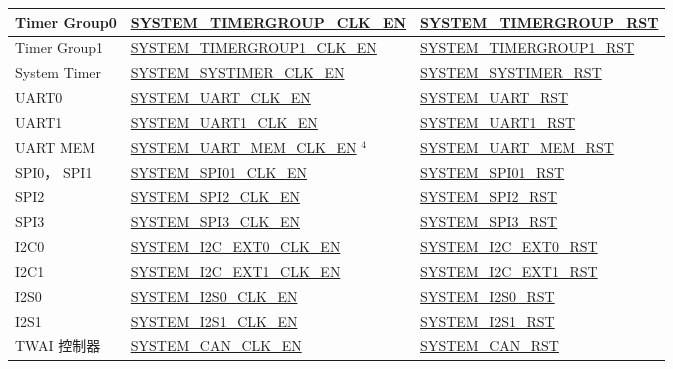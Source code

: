 \documentclass[main\_\_CN.tex]{subfiles}
\begin{document}
\begin{longtable}[c]{ |p{4cm}|p{6cm}|p{6cm}| }
Timer Group0    & \hyperref[fielddesc:SYSTEMTIMERGROUPCLKEN]{SYSTEM\_TIMERGROUP\_CLK\_EN} & \hyperref[fielddesc:SYSTEMTIMERGROUPRST]{SYSTEM\_TIMERGROUP\_RST} \\\hline
Timer Group1    & \hyperref[fielddesc:SYSTEMTIMERGROUP1CLKEN]{SYSTEM\_TIMERGROUP1\_CLK\_EN} & \hyperref[fielddesc:SYSTEMTIMERGROUP1RST]{SYSTEM\_TIMERGROUP1\_RST} \\\hline
System Timer    & \hyperref[fielddesc:SYSTEMSYSTIMERCLKEN]{SYSTEM\_SYSTIMER\_CLK\_EN} & \hyperref[fielddesc:SYSTEMSYSTIMERRST]{SYSTEM\_SYSTIMER\_RST} \\\hline
UART0    & \hyperref[fielddesc:SYSTEMUARTCLKEN]{SYSTEM\_UART\_CLK\_EN} & \hyperref[fielddesc:SYSTEMUARTRST]{SYSTEM\_UART\_RST} \\\hline
UART1    & \hyperref[fielddesc:SYSTEMUART1CLKEN]{SYSTEM\_UART1\_CLK\_EN} & \hyperref[fielddesc:SYSTEMUART1RST]{SYSTEM\_UART1\_RST} \\\hline
UART MEM    & \hyperref[fielddesc:SYSTEMUARTMEMCLKEN]{SYSTEM\_UART\_MEM\_CLK\_EN} {\hyperref[other:sysreg-reset-notes]{$^4$}} & \hyperref[fielddesc:SYSTEMUARTMEMRST]{SYSTEM\_UART\_MEM\_RST} \\\hline
SPI0， SPI1    & \hyperref[fielddesc:SYSTEMSPI01CLKEN]{SYSTEM\_SPI01\_CLK\_EN} & \hyperref[fielddesc:SYSTEMSPI01RST]{SYSTEM\_SPI01\_RST} \\\hline
SPI2    & \hyperref[fielddesc:SYSTEMSPI2CLKEN]{SYSTEM\_SPI2\_CLK\_EN} & \hyperref[fielddesc:SYSTEMSPI2RST]{SYSTEM\_SPI2\_RST} \\\hline
SPI3    & \hyperref[fielddesc:SYSTEMSPI3CLKEN]{SYSTEM\_SPI3\_CLK\_EN} & \hyperref[fielddesc:SYSTEMSPI3RST]{SYSTEM\_SPI3\_RST} \\\hline
I2C0    & \hyperref[fielddesc:SYSTEMI2CEXT0CLKEN]{SYSTEM\_I2C\_EXT0\_CLK\_EN} & \hyperref[fielddesc:SYSTEMI2CEXT0RST]{SYSTEM\_I2C\_EXT0\_RST} \\\hline
I2C1    & \hyperref[fielddesc:SYSTEMI2CEXT1CLKEN]{SYSTEM\_I2C\_EXT1\_CLK\_EN} & \hyperref[fielddesc:SYSTEMI2CEXT1RST]{SYSTEM\_I2C\_EXT1\_RST} \\\hline
I2S0    & \hyperref[fielddesc:SYSTEMI2S0CLKEN]{SYSTEM\_I2S0\_CLK\_EN} & \hyperref[fielddesc:SYSTEMI2S0RST]{SYSTEM\_I2S0\_RST} \\\hline
I2S1    & \hyperref[fielddesc:SYSTEMI2S1CLKEN]{SYSTEM\_I2S1\_CLK\_EN} & \hyperref[fielddesc:SYSTEMI2S1RST]{SYSTEM\_I2S1\_RST} \\\hline
TWAI 控制器    & \hyperref[fielddesc:SYSTEMCANCLKEN]{SYSTEM\_CAN\_CLK\_EN} & \hyperref[fielddesc:SYSTEMCANRST]{SYSTEM\_CAN\_RST} \\\hline

\end{longtable}
\end{document}

